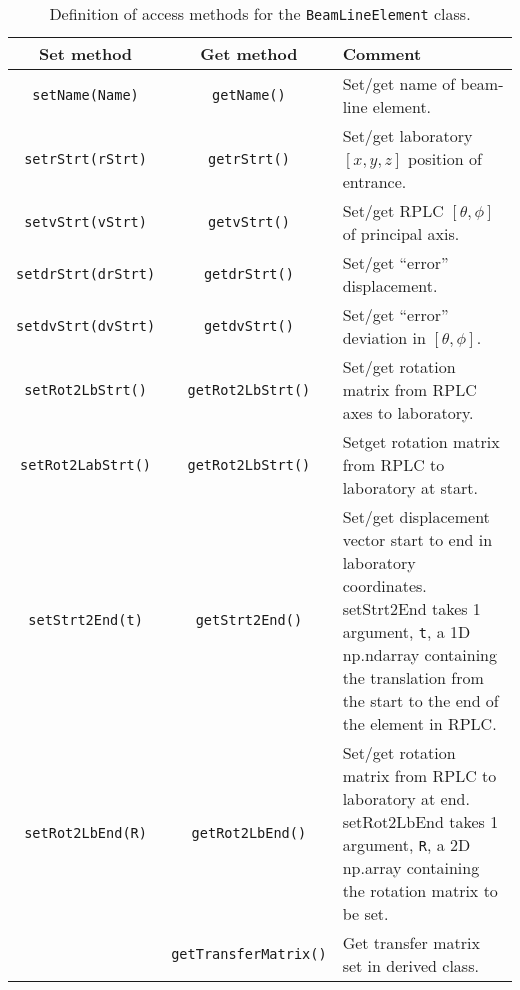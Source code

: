 \begin{table}[h]
  \caption{
    Definition of access methods for the \texttt{BeamLineElement}
    class. 
  }
  \label{Tab:BLE:Methods}
  \begin{center}
    \begin{tabular}{|c|c|p{7cm}|}
      \hline
      \textbf{Set method} & \textbf{Get method}  & \textbf{Comment}                                                         \\
      \hline
      \texttt{setName(Name)}     & \texttt{getName()}        & Set/get name of beam-line element.                                \\
      \texttt{setrStrt(rStrt)}   & \texttt{getrStrt()}       & Set/get laboratory $[x, y, z]$ position of entrance.              \\
                                         \texttt{setvStrt(vStrt)}   & \texttt{getvStrt()}      & Set/get RPLC $[\theta, \phi]$ of principal axis.                  \\
      \texttt{setdrStrt(drStrt)} & \texttt{getdrStrt()}      & Set/get ``error'' displacement.                                   \\
      \texttt{setdvStrt(dvStrt)} & \texttt{getdvStrt()}      & Set/get ``error'' deviation in $[\theta, \phi]$.                  \\
      \texttt{setRot2LbStrt()}   & \texttt{getRot2LbStrt()}  & Set/get rotation matrix from RPLC axes to laboratory.             \\
      \texttt{setRot2LabStrt()}  & \texttt{getRot2LbStrt()}  & Setget rotation matrix from RPLC to laboratory at start.             \\
      \texttt{setStrt2End(t)}    & \texttt{getStrt2End()}    & Set/get displacement vector start to end in laboratory coordinates.
                                                               setStrt2End takes 1 argument, \texttt{t}, a 1D np.ndarray containing
                                                               the translation from the start to the end of the element in RPLC. \\
      \texttt{setRot2LbEnd(R)}  & \texttt{getRot2LbEnd()}    & Set/get rotation matrix from RPLC to laboratory at end.
                                                               setRot2LbEnd takes 1 argument, \texttt{R}, a 2D np.array containing
                                                               the rotation matrix to be set.                                    \\
                                & \texttt{getTransferMatrix()}  & Get transfer matrix set in derived class.                         \\
      \hline
    \end{tabular}
  \end{center}
\end{table}


